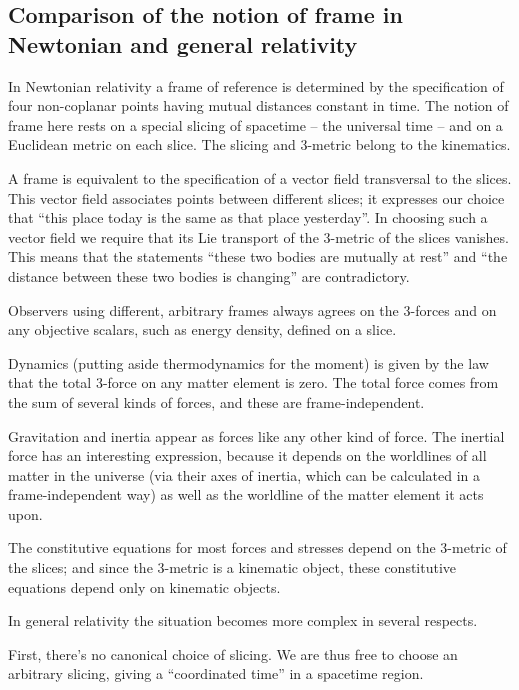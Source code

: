 \documentclass[\ifafour a4paper,12pt,\else a5paper,10pt,\fi%
onecolumn,oneside,article,%
british%
]{memoir}
\theoremstyle{remark}
\theoremstyle{innote}
\renewcommand*{\|}[1][]{\nonscript\,#1\vert\nonscript\;\mathopen{}}
\begin{document}
\subsection{Comparison of the notion of frame in Newtonian and general relativity}
\label{sec:frames_relativity}

In Newtonian relativity a frame of reference is determined by the
specification of four non-coplanar points having mutual distances constant
in time. The notion of frame here rests on a special slicing of spacetime
-- the universal time -- and on a Euclidean metric on each slice. The
slicing and 3-metric belong to the kinematics.

A frame is equivalent to the specification of a vector field transversal to
the slices. This vector field associates points between different slices;
it expresses our choice that \enquote{this place today is the same as that
  place yesterday}. In choosing such a vector field we require that its Lie
transport of the 3-metric of the slices vanishes. This means that the
statements \enquote{these two bodies are mutually at rest} and \enquote{the
  distance between these two bodies is changing} are contradictory.

Observers using different, arbitrary frames always agrees on the 3-forces
and on any objective scalars, such as energy density, defined on a slice.

Dynamics (putting aside thermodynamics for the moment) is given by the law
that the total 3-force on any matter element is zero. The total force comes
from the sum of several kinds of forces, and these are frame-independent.

Gravitation and inertia appear as forces like any other kind of force. The
inertial force has an interesting expression, because it depends on the
worldlines of all matter in the universe (via their axes of inertia, which
can be calculated in a frame-independent way) as well as the worldline of
the matter element it acts upon.

The constitutive equations for most forces and stresses depend on the
3-metric of the slices; and since the 3-metric is a kinematic object, these
constitutive equations depend only on kinematic objects.

\bigskip

In general relativity the situation becomes more complex in several
respects.

First, there's no canonical choice of slicing. We are thus free to choose
an arbitrary slicing, giving a \enquote{coordinated time} in a spacetime
region.
\end{document}
